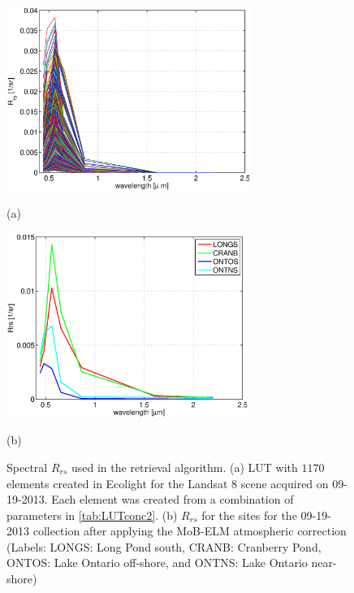 \documentclass[onecolumn,3p,letterpaper,11pt]{elsarticle}
\begin{document}
\begin{figure}[htb]
  \begin{minipage}[c]{0.49\linewidth}
    \centering
      \includegraphics[height=6cm]{./Images/LUTsmart130919_150422.eps}
      \centerline{(a)}\medskip
  \end{minipage}  
  \hfill
  \begin{minipage}[d]{0.49\linewidth}
    \centering
      \includegraphics[height=6cm]{./Images/ROI130919_150422.eps}
      \centerline{(b)}\medskip
  \end{minipage} 

  \caption{Spectral $R_{rs}$ used in the retrieval algorithm. (a) LUT with $1170$ elements created in Ecolight for the Landsat 8 scene acquired on 09-19-2013. Each element was created from a combination of parameters in \autoref{tab:LUTconc2}. (b) $R_{rs}$ for the sites for the 09-19-2013 collection after applying the MoB-ELM atmospheric correction (Labels: LONGS: Long Pond south, CRANB: Cranberry Pond, ONTOS: Lake Ontario off-shore, and ONTNS: Lake Ontario near-shore)}
      \label{fig:Rrsused}
\end{figure}
\end{document}
